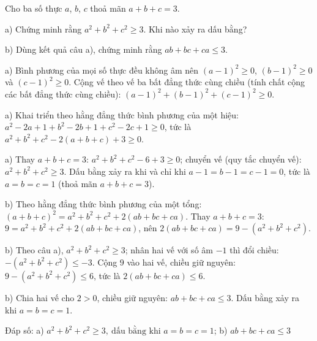 \begin{problem}[9DS-BPT-048]
Cho ba số thực $a$, $b$, $c$ thoả mãn $a + b + c = 3$.

a) Chứng minh rằng $a^2 + b^2 + c^2 \geq 3$. Khi nào xảy ra dấu bằng?

b) Dùng kết quả câu a), chứng minh rằng $ab + bc + ca \leq 3$.

\begin{solution}
a) Bình phương của mọi số thực đều không âm nên $(a - 1)^2 \geq 0$, $(b - 1)^2 \geq 0$ và $(c - 1)^2 \geq 0$. Cộng vế theo vế ba bất đẳng thức cùng chiều (tính chất cộng các bất đẳng thức cùng chiều): $(a - 1)^2 + (b - 1)^2 + (c - 1)^2 \geq 0$.

a) Khai triển theo hằng đẳng thức bình phương của một hiệu: $a^2 - 2a + 1 + b^2 - 2b + 1 + c^2 - 2c + 1 \geq 0$, tức là $a^2 + b^2 + c^2 - 2(a + b + c) + 3 \geq 0$.

a) Thay $a + b + c = 3$: $a^2 + b^2 + c^2 - 6 + 3 \geq 0$; chuyển vế (quy tắc chuyển vế): $a^2 + b^2 + c^2 \geq 3$. Dấu bằng xảy ra khi và chỉ khi $a - 1 = b - 1 = c - 1 = 0$, tức là $a = b = c = 1$ (thoả mãn $a + b + c = 3$).

b) Theo hằng đẳng thức bình phương của một tổng: $(a + b + c)^2 = a^2 + b^2 + c^2 + 2(ab + bc + ca)$. Thay $a + b + c = 3$: $9 = a^2 + b^2 + c^2 + 2(ab + bc + ca)$, nên $2(ab + bc + ca) = 9 - (a^2 + b^2 + c^2)$.

b) Theo câu a), $a^2 + b^2 + c^2 \geq 3$; nhân hai vế với số âm $-1$ thì đổi chiều: $-(a^2 + b^2 + c^2) \leq -3$. Cộng $9$ vào hai vế, chiều giữ nguyên: $9 - (a^2 + b^2 + c^2) \leq 6$, tức là $2(ab + bc + ca) \leq 6$.

b) Chia hai vế cho $2 > 0$, chiều giữ nguyên: $ab + bc + ca \leq 3$. Dấu bằng xảy ra khi $a = b = c = 1$.

Đáp số: a) $\boxed{a^2 + b^2 + c^2 \geq 3,\ \text{dấu bằng khi } a = b = c = 1}$; b) $\boxed{ab + bc + ca \leq 3}$
\end{solution}
\end{problem}

